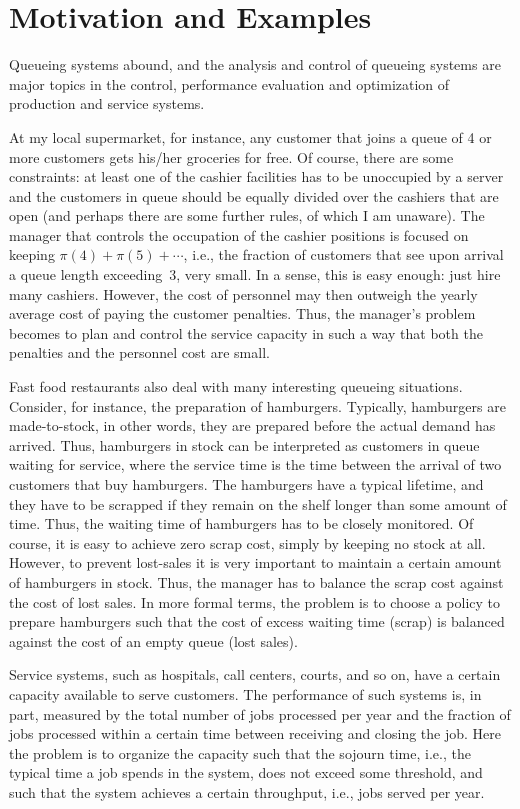 \section{Motivation and Examples}
Queueing systems abound, and the analysis and control of queueing systems are major topics in the control, performance evaluation and optimization of production and service systems.


At my local supermarket, for instance, any customer that joins a queue of 4 or more customers gets his/her groceries for free.
Of course, there are some constraints: at least one of the cashier facilities has to be unoccupied by a server and the customers in queue should be equally divided over the cashiers that are open (and perhaps there are some further rules, of which I am unaware).
The manager that controls the occupation of the cashier positions is focused on keeping $\pi(4)+\pi(5)+\cdots$, i.e., the fraction of customers that see upon arrival a queue length exceeding~3, very small.
In a sense, this is easy enough: just hire many cashiers.
However, the cost of personnel may then outweigh the yearly average cost of paying the customer penalties.
Thus, the manager's problem becomes to plan and control the service capacity in such a way that both the penalties and the personnel cost are small.

Fast food restaurants also deal with many interesting queueing situations.
Consider, for instance, the preparation of hamburgers.
Typically, hamburgers are made-to-stock, in other words, they are prepared before the actual demand has arrived.
Thus, hamburgers in stock can be interpreted as customers in queue waiting for service, where the service time is the time between the arrival of two customers that buy hamburgers.
The hamburgers have a typical lifetime, and they have to be scrapped if they remain on the shelf longer than some amount of time.
Thus, the waiting time of hamburgers has to be closely monitored.
Of course, it is easy to achieve zero scrap cost, simply by keeping no stock at all.
However, to prevent lost-sales it is very important to maintain a certain amount of hamburgers in stock.
Thus, the manager has to balance the scrap cost against the cost of lost sales.
In more formal terms, the problem is to choose a policy to prepare hamburgers such that the cost of excess waiting time (scrap) is balanced against the cost of an empty queue (lost sales).

Service systems, such as hospitals, call centers, courts, and so on,
have a certain capacity available to serve customers. The performance
of such systems is, in part, measured by the total number of jobs
processed per year and the fraction of jobs processed within a certain
time between receiving and closing the job. Here the problem is to
organize the capacity such that the sojourn time, i.e., the typical
time a job spends in the system, does not exceed some threshold, and
such that the system achieves a certain throughput, i.e., jobs served
per year. 

